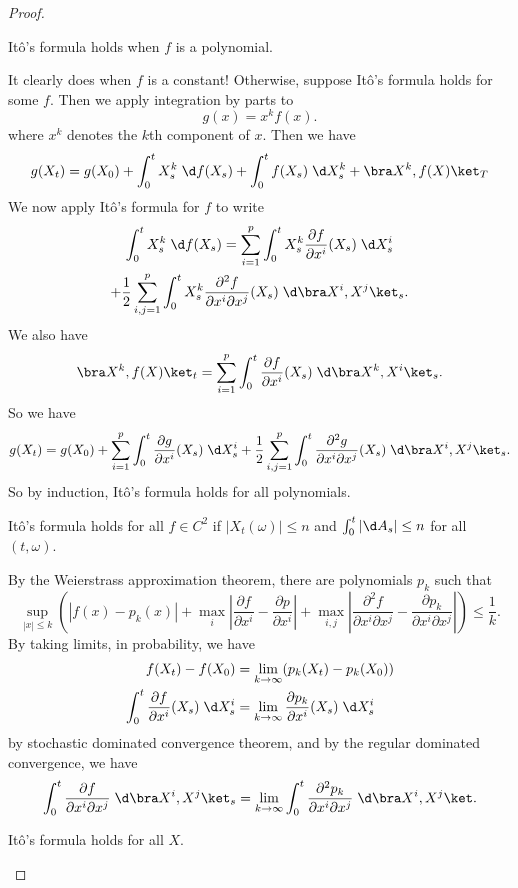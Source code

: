 \documentclass[a4paper]{article}
\begin{document}
\begin{proof}
  \begin{claim}
    It\^o's formula holds when $f$ is a polynomial.
  \end{claim}
  It clearly does when $f$ is a constant! Otherwise, suppose It\^o's formula holds for some $f$. Then we apply integration by parts to
  \[
    g(x) = x^k f(x).
  \]
  where $x^k$ denotes the $k$th component of $x$. Then we have
  \[
    g(X_t) = g(X_0) + \int_0^t X_s^k \;\d f(X_s) + \int_0^t f(X_s) \;\d X_s^k + \bra X^k, f(X)\ket_T
  \]
  We now apply It\^o's formula for $f$ to write
  \begin{multline*}
    \int_0^t X_s^k \;\d f(X_s) = \sum_{i = 1}^p \int_0^t X_s^k \frac{\partial f}{\partial x^i}(X_s) \;\d X_s^i\\
    + \frac{1}{2} \sum_{i, j = 1}^p \int_0^t X_s^k \frac{\partial^2f}{\partial x^i \partial x^j} (X_s)\;\d \bra X^i, X^j\ket_s.
  \end{multline*}
  We also have
  \[
    \bra X^k, f(X)\ket_t = \sum_{i = 1}^p \int_0^t \frac{\partial f}{\partial x^i}(X_s) \;\d \bra X^k, X^i\ket_s.
  \]
  So we have
  \[
    g(X_t) = g(X_0) + \sum_{i = 1}^p \int_0^t \frac{\partial g}{\partial x^i}(X_s) \;\d X_s^i + \frac{1}{2} \sum_{i, j = 1}^p \int_0^t \frac{\partial^2 g}{\partial x^i \partial x^j} (X_s) \;\d \bra X^i, X^j\ket_s.
  \]
  So by induction, It\^o's formula holds for all polynomials.

  \begin{claim}
    It\^o's formula holds for all $f \in C^2$ if $|X_t(\omega)| \leq n$ and $\int_0^t |\d A_s| \leq n$ for all $(t, \omega)$.
  \end{claim}

  By the Weierstrass approximation theorem, there are polynomials $p_k$ such that
  \[
    \sup_{|x| \leq k} \left(|f(x) - p_k(x)| + \max_i \left|\frac{\partial f}{\partial x^i} - \frac{\partial p}{\partial x^i}\right| + \max_{i, j} \left|\frac{\partial^2 f}{\partial x^i \partial x^j} - \frac{\partial p_k}{\partial x^i \partial x^j}\right| \right) \leq \frac{1}{k}.
  \]
  By taking limits, in probability, we have
  \begin{align*}
    f(X_t) - f(X_0) &= \lim_{k \to \infty} (p_k(X_t) - p_k(X_0))\\
    \int_0^t \frac{\partial f}{\partial x^i} (X_s) \;\d X_s^i &= \lim_{k \to \infty} \frac{\partial p_k}{\partial x^i} (X_s) \;\d X_s^i
  \end{align*}
  by stochastic dominated convergence theorem, and by the regular dominated convergence, we have
  \[
    \int_0^t \frac{\partial f}{\partial x^i \partial x^j} \;\d \bra X^i, X^j\ket_s = \lim_{k \to \infty} \int_0^t \frac{\partial^2 p_k}{\partial x^i \partial x^j} \;\d \bra X^i, X^j\ket.
  \]
  \begin{claim}
    It\^o's formula holds for all $X$.
  \end{claim}


\end{proof}
\end{document}
